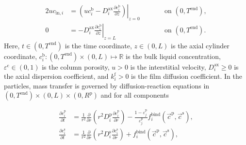 \documentclass{article}
\begin{document}
\begin{alignat}{2}
u c_{\mathrm{in},i} &= \left.\left( u c^{\mathrm{b}}_i - D^{\mathrm{ax}}_{i} \frac{\partial c^{\mathrm{b}}_i}{\partial z}\right)\right|_{z=0} & &\qquad\text{on }(0, T^{\mathrm{end}}),\\
               0 &= - D^{\mathrm{ax}}_{i} \left. \frac{\partial c^{\mathrm{b}}_i}{\partial z} \right|_{z=L} & &\qquad\text{on }(0, T^{\mathrm{end}}).
\end{alignat}
Here, $t\in (0, T^{\mathrm{end}})$ is the time coordinate, $z\in (0, L)$ is the axial cylinder coordinate, $c^{\mathrm{b}}_i\colon (0, T^\mathrm{end})\times (0, L) \mapsto \mathbb{R}$ is the bulk liquid concentration, $\varepsilon^{\mathrm{c}}\in (0, 1)$ is the column porosity, $u> 0$ is the interstitial velocity, $D^\mathrm{ax}_i\geq 0$ is the axial dispersion coefficient, and $k^\mathrm{f}_{i}> 0$ is the film diffusion coefficient.
In the particles, mass transfer is governed by diffusion-reaction equations in $ (0, T^\mathrm{end}) \times (0, L)\times (0, R^{\mathrm{p}})$ and for all components

\begin{align}
\frac{\partial c^{\mathrm{p}}_{i}}{\partial t} &= \frac{1}{r^2} \frac{\partial }{\partial r} \left( r^2 D_{i}^{\mathrm{p}} \frac{\partial c^{\mathrm{p}}_{i}}{\partial r} \right) - \frac{1 - \varepsilon^{\mathrm{p}}_{j}}{\varepsilon^{\mathrm{p}}_{j}}f^{\mathrm{bind}}_{i}\left( \vec{c}^{\mathrm{p}}, \vec{c}^{\mathrm{s}} \right) , \\
\frac{\partial c^{\mathrm{s}}_{i}}{\partial t} &=  \frac{1}{r^2} \frac{\partial }{\partial r} \left( r^2 D_{i}^{\mathrm{s}} \frac{\partial c^{\mathrm{s}}_{i}}{\partial r} \right)  + f^{\mathrm{bind}}_{i}\left( \vec{c}^{\mathrm{p}}, \vec{c}^{\mathrm{s}} \right) ,
\end{align}
\end{document}
